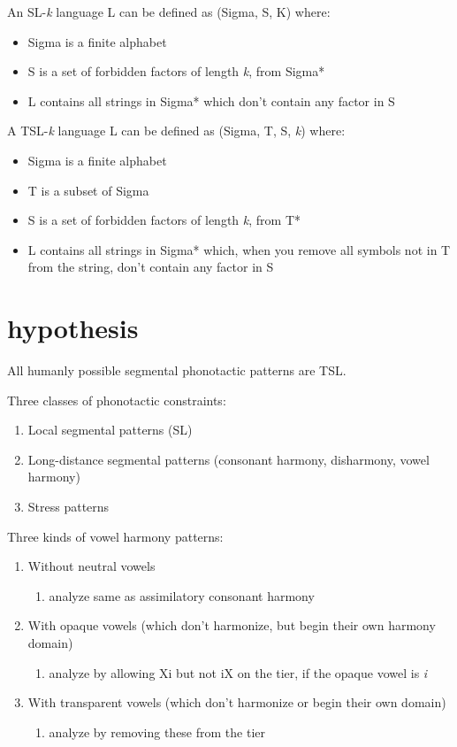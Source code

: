 An SL-\textit{k} language L can be defined as (Sigma, S, K) where:

\begin{itemize}
  \item Sigma is a finite alphabet
  \item S is a set of forbidden factors of length \textit{k}, from Sigma*
  \item L contains all strings in Sigma* which don't contain any factor in S
\end{itemize}

A TSL-\textit{k} language L can be defined as (Sigma, T, S, \textit{k}) where:

\begin{itemize}
  \item Sigma is a finite alphabet
  \item T is a subset of Sigma
  \item S is a set of forbidden factors of length \textit{k}, from T*
  \item L contains all strings in Sigma* which, when you remove all symbols not in T from the string, don't contain any factor in S
\end{itemize}

\section*{hypothesis}

All humanly possible segmental phonotactic patterns are TSL.

Three classes of phonotactic constraints:

\begin{enumerate}
  \item Local segmental patterns (SL)
  \item Long-distance segmental patterns (consonant harmony, disharmony, vowel harmony)
  \item Stress patterns
\end{enumerate}

Three kinds of vowel harmony patterns:

\begin{enumerate}
  \item Without neutral vowels
  \begin{enumerate}
    \item analyze same as assimilatory consonant harmony
  \end{enumerate}
  \item With opaque vowels (which don't harmonize, but begin their own harmony domain)
  \begin{enumerate}
    \item analyze by allowing Xi but not iX on the tier, if the opaque vowel is \textit{i}
  \end{enumerate}
  \item With transparent vowels (which don't harmonize or begin their own domain)
  \begin{enumerate}
    \item analyze by removing these from the tier
  \end{enumerate}
\end{enumerate}
